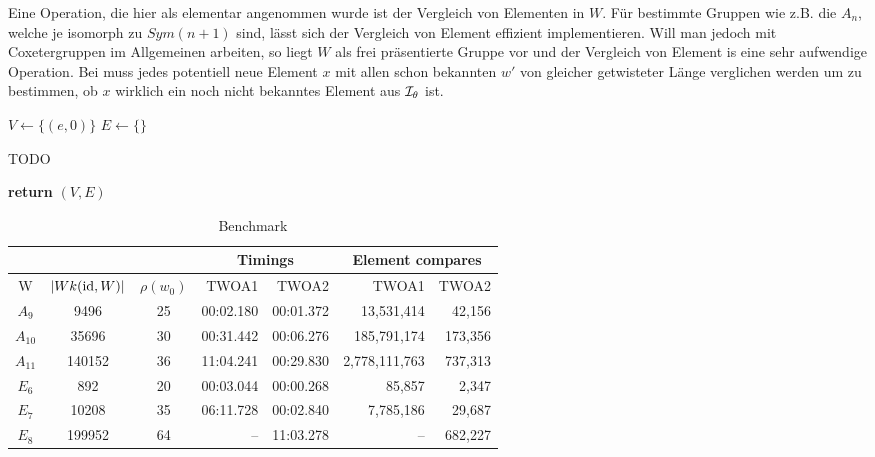 Eine Operation, die hier als elementar angenommen wurde ist der Vergleich von
Elementen in $W$. Für bestimmte Gruppen wie z.B. die $A_n$, welche je isomorph
zu $Sym(n+1)$ sind, lässt sich der Vergleich von Element effizient
implementieren. Will man jedoch mit Coxetergruppen im Allgemeinen arbeiten, so
liegt $W$ als frei präsentierte Gruppe vor und der Vergleich von Element is eine
sehr aufwendige Operation. Bei  muss jedes
potentiell neue Element $x$ mit allen schon bekannten $w'$ von gleicher
getwisteter Länge verglichen werden um zu bestimmen, ob $x$ wirklich ein noch
nicht bekanntes Element aus $\mathcal{I}_{\theta}$ ist.

\begin{algo}[Algorithmus 2]
\hfill
\label{twoa2}
\begin{algorithmic}[1]
 
\State $V \gets \{(e,0)\}$
\State $E \gets \{\}$

	\State TODO
\EndFor

\State \textbf{return} $(V,E)$
\EndProcedure
\end{algorithmic}
\end{algo}

\begin{table}
\label{benchmark-twoa}
\centering
\begin{tabular}{|c|c|c|r|r|r|r|}
\hline
\multicolumn{3}{|c|}{} & \multicolumn{2}{|c|}{Timings} &
\multicolumn{2}{|c|}{Element compares}\\
\hline
W & $|Wk(\operatorname{id},W)|$ & $\rho(w_0)$ & TWOA1 & TWOA2 & TWOA1 & TWOA2\\
\hline
$A_9$ & 9496 & 25 & 00:02.180 & 00:01.372 & 13,531,414 & 42,156\\
\hline
$A_{10}$ & 35696 & 30 & 00:31.442 & 00:06.276 & 185,791,174 & 173,356\\
\hline
$A_{11}$ & 140152 & 36 & 11:04.241 & 00:29.830 & 2,778,111,763 & 737,313\\
\hline
$E_6$ & 892 & 20 & 00:03.044 & 00:00.268 & 85,857 & 2,347\\
\hline
$E_7$ & 10208 & 35 & 06:11.728 & 00:02.840 & 7,785,186 & 29,687\\
\hline
$E_8$ & 199952 & 64 & -- & 11:03.278 & -- & 682,227\\
\hline
\end{tabular}
\caption{Benchmark}
\end{table}

